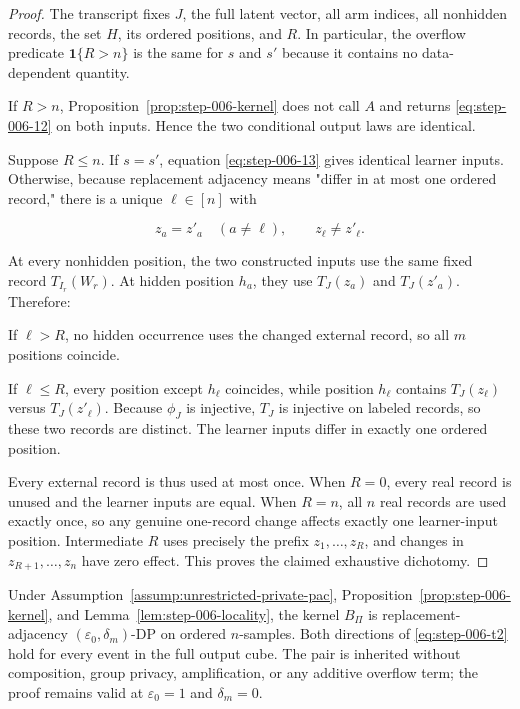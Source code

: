 \begin{proof}

The transcript fixes \(J\), the full latent vector, all arm indices, all nonhidden records, the set \(H\), its ordered positions, and \(R\). In particular, the overflow predicate \(\mathbf 1\{R>n\}\) is the same for \(s\) and \(s'\) because it contains no data-dependent quantity.

If \(R>n\), Proposition~\ref{prop:step-006-kernel} does not call \(A\) and returns \eqref{eq:step-006-12} on both inputs. Hence the two conditional output laws are identical.

Suppose \(R\le n\). If \(s=s'\), equation \eqref{eq:step-006-13} gives identical learner inputs. Otherwise, because replacement adjacency means "differ in at most one ordered record," there is a unique \(\ell \in [n]\) with

\[
z_a=z'_a\quad(a\ne\ell),
\qquad z_\ell\ne z'_\ell.
\tag{16}\label{eq:step-006-16}
\]

At every nonhidden position, the two constructed inputs use the same fixed record \(T_{I_r}(W_r)\). At hidden position \(h_a\), they use \(T_J(z_a)\) and \(T_J(z'_a)\). Therefore:

\par\noindent If \(\ell>R\), no hidden occurrence uses the changed external record, so all \(m\) positions coincide.
\par\noindent If \(\ell\le R\), every position except \(h_\ell\) coincides, while position \(h_\ell\) contains \(T_J(z_\ell)\) versus \(T_J(z'_\ell)\). Because \(\phi_J\) is injective, \(T_J\) is injective on labeled records, so these two records are distinct. The learner inputs differ in exactly one ordered position.

Every external record is thus used at most once. When \(R=0\), every real record is unused and the learner inputs are equal. When \(R=n\), all \(n\) real records are used exactly once, so any genuine one-record change affects exactly one learner-input position. Intermediate \(R\) uses precisely the prefix \(z_1,\ldots,z_R\), and changes in \(z_{R+1},\ldots,z_n\) have zero effect. This proves the claimed exhaustive dichotomy.

\end{proof}


\begin{proposition}
\label{prop:step-006-exact-dp}

Under Assumption~\ref{assump:unrestricted-private-pac}, Proposition~\ref{prop:step-006-kernel}, and Lemma~\ref{lem:step-006-locality}, the kernel \(B_\Pi\) is replacement-adjacency \((\varepsilon_0,\delta_m)\)-DP on ordered \(n\)-samples. Both directions of \eqref{eq:step-006-t2} hold for every event in the full output cube. The pair is inherited without composition, group privacy, amplification, or any additive overflow term; the proof remains valid at \(\varepsilon_0=1\) and \(\delta_m=0\).

\end{proposition}


